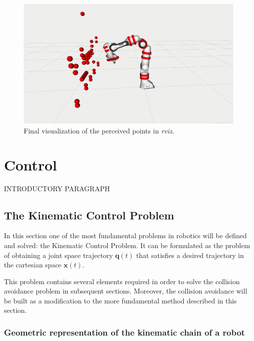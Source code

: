 \begin{figure}[H]
    \caption[Spheres]{
    Final visualization of the perceived points in \textit{rviz}.
    }
    \begin{center}
    \includegraphics[width=\textwidth]{figs/visualizationpoints.png}
    \end{center}
\label{fig:visualizationpoints}
\end{figure}







\section{Control}
\label{s:control}

INTRODUCTORY PARAGRAPH

\subsection{The Kinematic Control Problem}
\label{ss:kinematiccontrol}
In this section one of the most fundamental problems in robotics will be defined and solved: the Kinematic Control Problem. It can be formulated as the problem of obtaining a joint space trajectory $\mathbf{q}(t)$ that satisfies a desired trajectory in the cartesian space $\mathbf{x}(t)$.

This problem contains several elements required in order to solve the collision avoidance problem in subsequent sections. Moreover, the collision avoidance will be built as a modification to the more fundamental method described in this section.

\subsubsection{Geometric representation of the kinematic chain of a robot}
\label{sss:geomrep}

